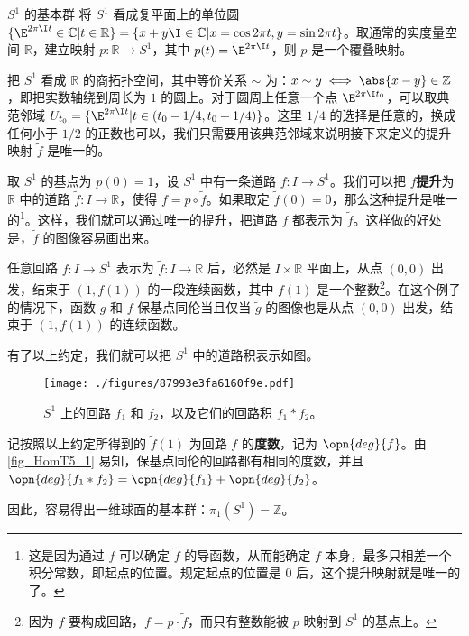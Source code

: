 \begin{example}{$S^1$ 的基本群}\label{ex_HomT5_2}
将 $S^1$ 看成复平面上的单位圆 $\{\E^{2\pi\I t}\in\mathbb{C}|t\in\mathbb{R}\}=\{x+y\I\in\mathbb{C}|x=\cos{2\pi t}, y=\sin{2\pi t}\}$。取通常的实度量空间 $\mathbb{R}$，建立映射 $p:\mathbb{R}\rightarrow S^1$，其中 $p(t)=\E^{2\pi\I t}$，则 $p$ 是一个覆叠映射。

把 $S^1$ 看成 $\mathbb{R}$ 的商拓扑空间，其中等价关系 $\sim$ 为：$x\sim y\iff \abs{x-y}\in\mathbb{Z}$，即把实数轴绕到周长为 $1$ 的圆上。对于圆周上任意一个点 $\E^{2\pi\I t_0}$，可以取典范邻域 $U_{t_0}=\{\E^{2\pi\I t}|t\in(t_0-1/4, t_0+1/4)\}$。这里 $1/4$ 的选择是任意的，换成任何小于 $1/2$ 的正数也可以，我们只需要用该典范邻域来说明接下来定义的提升映射 $\tilde{f}$ 是唯一的。

取 $S^1$ 的基点为 $p(0)=1$，设 $S^1$ 中有一条道路 $f:I\rightarrow S^1$。我们可以把 $f$\textbf{提升}为 $\mathbb{R}$ 中的道路 $\tilde{f}:I\rightarrow\mathbb{R}$，使得 $f=p\circ\tilde{f}$。如果取定 $\tilde{f}(0)=0$，那么这种提升是唯一的\footnote{这是因为通过 $f$ 可以确定 $\tilde{f}$ 的导函数，从而能确定 $\tilde{f}$ 本身，最多只相差一个积分常数，即起点的位置。规定起点的位置是 $0$ 后，这个提升映射就是唯一的了。}。这样，我们就可以通过唯一的提升，把道路 $f$ 都表示为 $\tilde{f}$。这样做的好处是，$\tilde{f}$ 的图像容易画出来。

任意回路 $f:I\rightarrow S^1$ 表示为 $\tilde{f}:I\rightarrow\mathbb{R}$ 后，必然是 $I\times\mathbb{R}$ 平面上，从点 $(0, 0)$ 出发，结束于 $(1, f(1))$ 的一段连续函数，其中 $f(1)$ 是一个整数\footnote{因为 $f$ 要构成回路，$f=p\cdot\tilde{f}$，而只有整数能被 $p$ 映射到 $S^1$ 的基点上。}。在这个例子的情况下，函数 $g$ 和 $f$ 保基点同伦当且仅当 $\tilde{g}$ 的图像也是从点 $(0, 0)$ 出发，结束于 $(1, f(1))$ 的连续函数。

有了以上约定，我们就可以把 $S^1$ 中的道路积表示如图。

\begin{figure}[ht]
\centering
\texttt{[image: ./figures/87993e3fa6160f9e.pdf]}
\caption{$S^1$ 上的回路 $f_1$ 和 $f_2$，以及它们的回路积 $f_1*f_2$。} \label{fig_HomT5_1}
\end{figure}

记按照以上约定所得到的 $\tilde{f}(1)$ 为回路 $f$ 的\textbf{度数}，记为 $\opn{deg}{f}$。由\autoref{fig_HomT5_1} 易知，保基点同伦的回路都有相同的度数，并且 $\opn{deg}{f_1*f_2}=\opn{deg}{f_1}+\opn{deg}{f_2}$。

因此，容易得出一维球面的基本群：$\pi_1(S^1)=\mathbb{Z}$。


\end{example}

